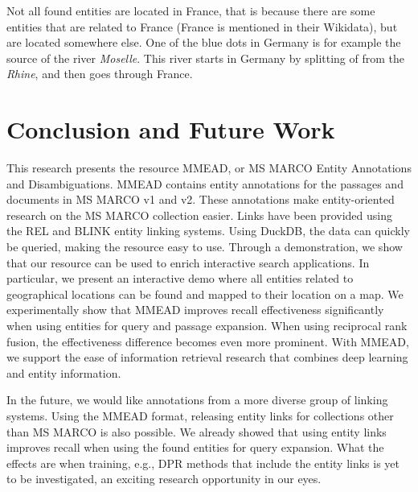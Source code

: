 Not all found entities are located in France, that is because there are some entities that are related to France (France is mentioned in their Wikidata), but are located somewhere else. One of the blue dots in Germany is for example the source of the river \emph{Moselle}. This river starts in Germany by splitting of from the \emph{Rhine}, and then goes through France. 


\section{Conclusion and Future Work}
This research presents the resource MMEAD, or MS MARCO Entity Annotations and Disambiguations. MMEAD contains entity annotations for the passages and documents in MS MARCO v1 and v2. These annotations make entity-oriented research on the MS MARCO collection easier. Links have been provided using the REL and BLINK entity linking systems. Using DuckDB, the data can quickly be queried, making the resource easy to use. 
Through a demonstration, we show that our resource can be used to enrich interactive search applications. In particular, we present an interactive demo where all entities related to geographical locations can be found and mapped to their location on a map. We experimentally show that MMEAD improves recall effectiveness significantly when using entities for query and passage expansion. When using reciprocal rank fusion, the effectiveness difference becomes even more prominent. With MMEAD, we support the ease of information retrieval research that combines deep learning and entity information. 

In the future, we would like annotations from a more diverse group of linking systems. Using the MMEAD format, releasing entity links for collections other than MS MARCO is also possible. We already showed that using entity links improves recall when using the found entities for query expansion. What the effects are when training, e.g., DPR methods that include the entity links is yet to be investigated, an exciting research opportunity in our eyes. 
